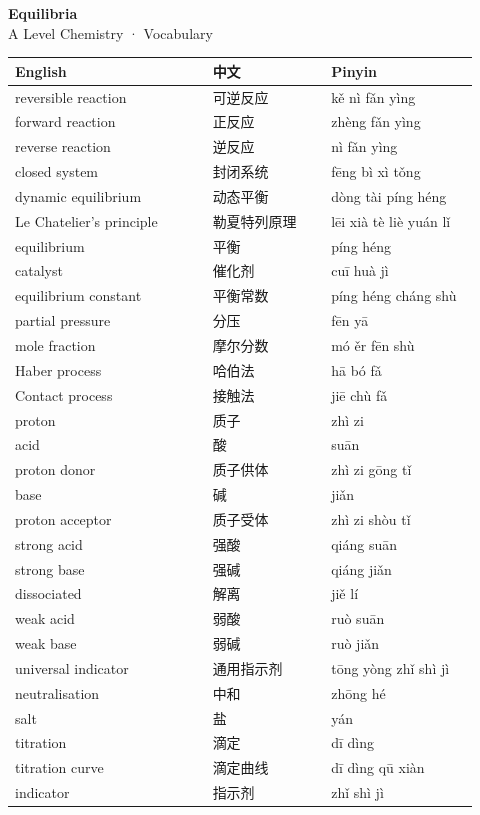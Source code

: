 \documentclass[11pt]{article}
\begin{document}
\begin{center}
  {\LARGE\bfseries Equilibria}\\[0.35em]
  {\large A Level Chemistry · Vocabulary}
\end{center}
\vspace{0.6em}

\begin{longtable}{@{}p{0.40\linewidth}p{0.24\linewidth}p{0.30\linewidth}@{}}
\toprule
\textbf{English} & \textbf{中文} & \textbf{Pinyin} \\
\midrule
\endhead
\bottomrule
\endlastfoot
reversible reaction & 可逆反应 & kě nì fǎn yìng \\
forward reaction & 正反应 & zhèng fǎn yìng \\
reverse reaction & 逆反应 & nì fǎn yìng \\
closed system & 封闭系统 & fēng bì xì tǒng \\
dynamic equilibrium & 动态平衡 & dòng tài píng héng \\
Le Chatelier's principle & 勒夏特列原理 & lēi xià tè liè yuán lǐ \\
equilibrium & 平衡 & píng héng \\
catalyst & 催化剂 & cuī huà jì \\
equilibrium constant & 平衡常数 & píng héng cháng shù \\
partial pressure & 分压 & fēn yā \\
mole fraction & 摩尔分数 & mó ěr fēn shù \\
Haber process & 哈伯法 & hā bó fǎ \\
Contact process & 接触法 & jiē chù fǎ \\
proton & 质子 & zhì zi \\
acid & 酸 & suān \\
proton donor & 质子供体 & zhì zi gōng tǐ \\
base & 碱 & jiǎn \\
proton acceptor & 质子受体 & zhì zi shòu tǐ \\
strong acid & 强酸 & qiáng suān \\
strong base & 强碱 & qiáng jiǎn \\
dissociated & 解离 & jiě lí \\
weak acid & 弱酸 & ruò suān \\
weak base & 弱碱 & ruò jiǎn \\
universal indicator & 通用指示剂 & tōng yòng zhǐ shì jì \\
neutralisation & 中和 & zhōng hé \\
salt & 盐 & yán \\
titration & 滴定 & dī dìng \\
titration curve & 滴定曲线 & dī dìng qū xiàn \\
indicator & 指示剂 & zhǐ shì jì \\
\end{longtable}
\end{document}
